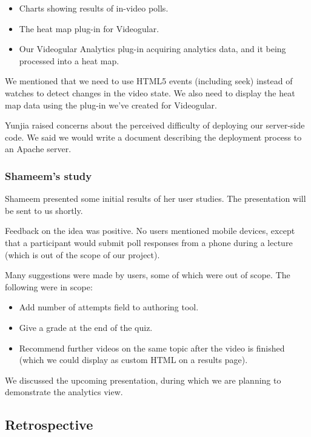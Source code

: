 \begin{itemize}
\itemsep1pt\parskip0pt
\item
  Charts showing results of in-video polls.
\item
  The heat map plug-in for Videogular.
\item
  Our Videogular Analytics plug-in acquiring analytics data, and it
  being processed into a heat map.
\end{itemize}

We mentioned that we need to use HTML5 events (including seek) instead
of watches to detect changes in the video state. We also need to display
the heat map data using the plug-in we've created for Videogular.

Yunjia raised concerns about the perceived difficulty of deploying our
server-side code. We said we would write a document describing the
deployment process to an Apache server.

\subsubsection{Shameem's study}

Shameem presented some initial results of her user studies. The
presentation will be sent to us shortly.

Feedback on the idea was positive. No users mentioned mobile devices,
except that a participant would submit poll responses from a phone
during a lecture (which is out of the scope of our project).

Many suggestions were made by users, some of which were out of scope.
The following were in scope:

\begin{itemize}
\itemsep1pt\parskip0pt
\item
  Add number of attempts field to authoring tool.
\item
  Give a grade at the end of the quiz.
\item
  Recommend further videos on the same topic after the video is finished
  (which we could display as custom HTML on a results page).
\end{itemize}

We discussed the upcoming presentation, during which we are planning to
demonstrate the analytics view.

\subsection{Retrospective}

